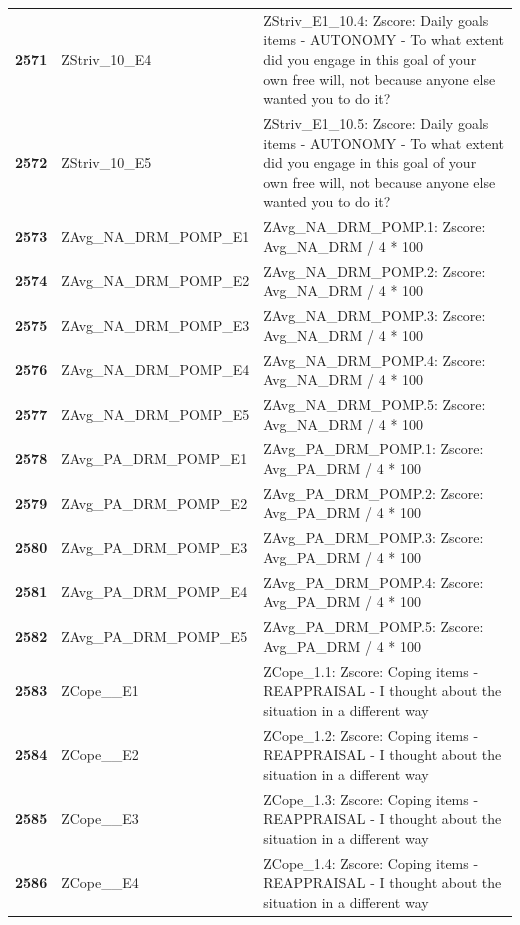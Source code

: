 \documentclass[
  letterpaper,
  DIV=11,
  numbers=noendperiod]{scrartcl}
\begin{document}
\begin{longtable}[t]{>{}cll}
\addlinespace
\textbf{2571} & ZStriv\_10\_E4 & ZStriv\_E1\_10.4: Zscore:  Daily goals items - AUTONOMY - To what extent did you engage in this goal of your own free will, not because anyone else wanted you to do it?\\
\textbf{2572} & ZStriv\_10\_E5 & ZStriv\_E1\_10.5: Zscore:  Daily goals items - AUTONOMY - To what extent did you engage in this goal of your own free will, not because anyone else wanted you to do it?\\
\textbf{2573} & ZAvg\_NA\_DRM\_POMP\_E1 & ZAvg\_NA\_DRM\_POMP.1: Zscore:  Avg\_NA\_DRM / 4 * 100\\
\textbf{2574} & ZAvg\_NA\_DRM\_POMP\_E2 & ZAvg\_NA\_DRM\_POMP.2: Zscore:  Avg\_NA\_DRM / 4 * 100\\
\textbf{2575} & ZAvg\_NA\_DRM\_POMP\_E3 & ZAvg\_NA\_DRM\_POMP.3: Zscore:  Avg\_NA\_DRM / 4 * 100\\
\addlinespace
\textbf{2576} & ZAvg\_NA\_DRM\_POMP\_E4 & ZAvg\_NA\_DRM\_POMP.4: Zscore:  Avg\_NA\_DRM / 4 * 100\\
\textbf{2577} & ZAvg\_NA\_DRM\_POMP\_E5 & ZAvg\_NA\_DRM\_POMP.5: Zscore:  Avg\_NA\_DRM / 4 * 100\\
\textbf{2578} & ZAvg\_PA\_DRM\_POMP\_E1 & ZAvg\_PA\_DRM\_POMP.1: Zscore:  Avg\_PA\_DRM / 4 * 100\\
\textbf{2579} & ZAvg\_PA\_DRM\_POMP\_E2 & ZAvg\_PA\_DRM\_POMP.2: Zscore:  Avg\_PA\_DRM / 4 * 100\\
\textbf{2580} & ZAvg\_PA\_DRM\_POMP\_E3 & ZAvg\_PA\_DRM\_POMP.3: Zscore:  Avg\_PA\_DRM / 4 * 100\\
\addlinespace
\textbf{2581} & ZAvg\_PA\_DRM\_POMP\_E4 & ZAvg\_PA\_DRM\_POMP.4: Zscore:  Avg\_PA\_DRM / 4 * 100\\
\textbf{2582} & ZAvg\_PA\_DRM\_POMP\_E5 & ZAvg\_PA\_DRM\_POMP.5: Zscore:  Avg\_PA\_DRM / 4 * 100\\
\textbf{2583} & ZCope\_\_E1 & ZCope\_1.1: Zscore:  Coping items - REAPPRAISAL - I thought about the situation in a different way\\
\textbf{2584} & ZCope\_\_E2 & ZCope\_1.2: Zscore:  Coping items - REAPPRAISAL - I thought about the situation in a different way\\
\textbf{2585} & ZCope\_\_E3 & ZCope\_1.3: Zscore:  Coping items - REAPPRAISAL - I thought about the situation in a different way\\
\addlinespace
\textbf{2586} & ZCope\_\_E4 & ZCope\_1.4: Zscore:  Coping items - REAPPRAISAL - I thought about the situation in a different way\\

\end{longtable}
\end{document}
